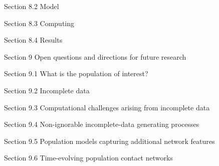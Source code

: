 \item[] Section 8.2 Model
\item[] Section 8.3 Computing
\item[] Section 8.4 Results
\ei
\item[] Section 9 Open questions and directions for future research
\bi
\item[] Section 9.1 What is the population of interest?
\item[] Section 9.2 Incomplete data
\item[] Section 9.3 Computational challenges arising from incomplete data
\item[] Section 9.4 Non-ignorable incomplete-data generating processes
\item[] Section 9.5 Population models capturing additional network features
\item[] Section 9.6 Time-evolving population contact networks
\ei
\ei
